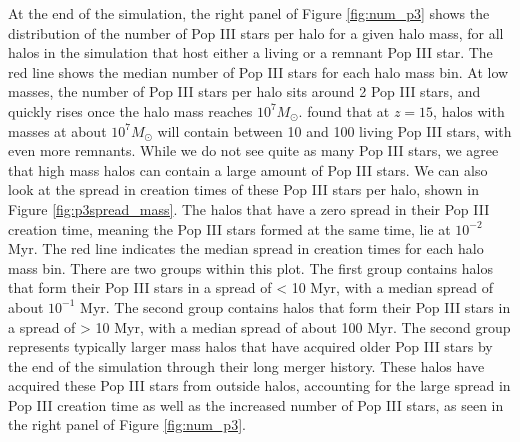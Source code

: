 \documentclass[a4paper,fleqn,usenatbib]{mnras}
\begin{document}
At the end of the simulation, the right panel of Figure \ref{fig:num_p3} shows the distribution of the number of Pop III stars per halo for a given halo mass, for all halos in the simulation that host either a living or a remnant Pop III star. The red line shows the median number of Pop III stars for each halo mass bin. At low masses, the number of Pop III stars per halo sits around 2 Pop III stars, and quickly rises once the halo mass reaches $10^{7} M_{\odot}$. \citet{Xu13} found that at $z = 15$, halos with masses at about $10^{7} M_{\odot}$ will contain between 10 and 100 living Pop III stars, with even more remnants. While we do not see quite as many Pop III stars, we agree that high mass halos can contain a large amount of Pop III stars. We can also look at the spread in creation times of these Pop III stars per halo, shown in Figure \ref{fig:p3spread_mass}. The halos that have a zero spread in their Pop III creation time, meaning the Pop III stars formed at the same time, lie at $10^{-2}$ Myr. The red line indicates the median spread in creation times for each halo mass bin. There are two groups within this plot. The first group contains halos that form their Pop III stars in a spread of < 10 Myr, with a median spread of about $10^{-1}$ Myr. The second group contains halos that form their Pop III stars in a spread of > 10 Myr, with a median spread of about 100 Myr. The second group represents typically larger mass halos that have acquired older Pop III stars by the end of the simulation through their long merger history. These halos have acquired these Pop III stars from outside halos, accounting for the large spread in Pop III creation time as well as the increased number of Pop III stars, as seen in the right panel of Figure \ref{fig:num_p3}. 
\end{document}
